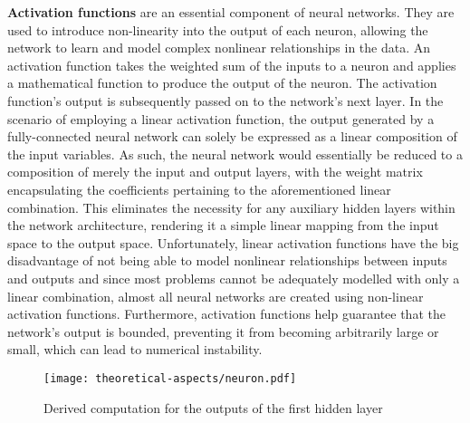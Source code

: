 \textbf{Activation functions} are an essential component of neural networks. They are used to introduce non-linearity into the output of each neuron, allowing the network to learn and model complex nonlinear relationships in the data. An activation function takes the weighted sum of the inputs to a neuron and applies a mathematical function to produce the output of the neuron. The activation function's output is subsequently passed on to the network's next layer. In the scenario of employing a linear activation function, the output generated by a fully-connected neural network can solely be expressed as a linear composition of the input variables. As such, the neural network would essentially be reduced to a composition of merely the input and output layers, with the weight matrix encapsulating the coefficients pertaining to the aforementioned linear combination. This eliminates the necessity for any auxiliary hidden layers within the network architecture, rendering it a simple linear mapping from the input space to the output space. Unfortunately, linear activation functions have the big disadvantage of not being able to model nonlinear relationships between inputs and outputs and since most problems cannot be adequately modelled with only a linear combination, almost all neural networks are created using non-linear activation functions. Furthermore, activation functions help guarantee that the network's output is bounded, preventing it from becoming arbitrarily large or small, which can lead to numerical instability.
\begin{figure}[ht]
    \centering
    \texttt{[image: theoretical-aspects/neuron.pdf]}
    \caption[Derived computation for the outputs of the first hidden layer]{Derived computation for the outputs of the first hidden layer~\supercite{tikz-nn}}
    \label{fig:neuron}
\end{figure}

